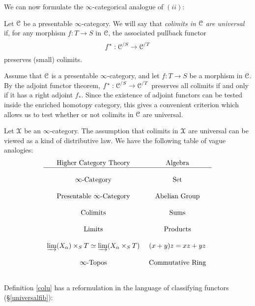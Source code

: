 We can now formulate the $\infty$-categorical analogue of $(ii)$:

\begin{definition}\label{colu}
Let $\operatorname{\mathcal{C}}$ be a presentable $\infty$-category. We will say that {\it colimits in $\operatorname{\mathcal{C}}$
are universal} if, for any morphism $f: T \rightarrow S$ in $\operatorname{\mathcal{C}}$, the associated pullback functor
$$ f^{\ast}: \operatorname{\mathcal{C}}^{/S} \rightarrow \operatorname{\mathcal{C}}^{/T}$$
preserves (small) colimits.
\end{definition}

Assume that $\operatorname{\mathcal{C}}$ is a presentable $\infty$-category, and let $f: T \rightarrow S$ be a morphism in $\operatorname{\mathcal{C}}$. By the adjoint functor theorem, $f^{\ast}: \operatorname{\mathcal{C}}^{/S} \rightarrow \operatorname{\mathcal{C}}^{/T}$ preserves all colimits if and only if it has a right adjoint $f_{\ast}$. Since the existence of adjoint functors can be tested inside the enriched homotopy category, this gives a convenient criterion which allows us to test whether or not colimits in $\operatorname{\mathcal{C}}$ are universal.

\begin{remark}
Let $\operatorname{\mathcal{X}}$ be an $\infty$-category. The assumption that colimits in $\operatorname{\mathcal{X}}$ are universal can be viewed as a kind of distributive law. We have the following table of vague analogies:
$$
\begin{array}{cc}
\text{ Higher Category Theory } & \text{ Algebra } \\
\hline
\\
\text{ $\infty$-Category } & \text{ Set } \\ \\
\text{ Presentable $\infty$-Category } & \text{ Abelian Group } \\ \\
\text{ Colimits } & \text{ Sums } \\ \\
\text{ Limits } & \text{ Products } \\ \\
\operatorname{\varinjlim}( X_{\alpha}) \times_{S} T \simeq \operatorname{\varinjlim}( X_{\alpha} \times_{S} T) & (x+y)z=xz+yz \\ \\
\text{ $\infty$-Topos } & \text{ Commutative Ring } \\ \\
\end{array}$$
\end{remark}

Definition \ref{colu} has a reformulation in the language of classifying functors (\S \ref{universalfib}):

